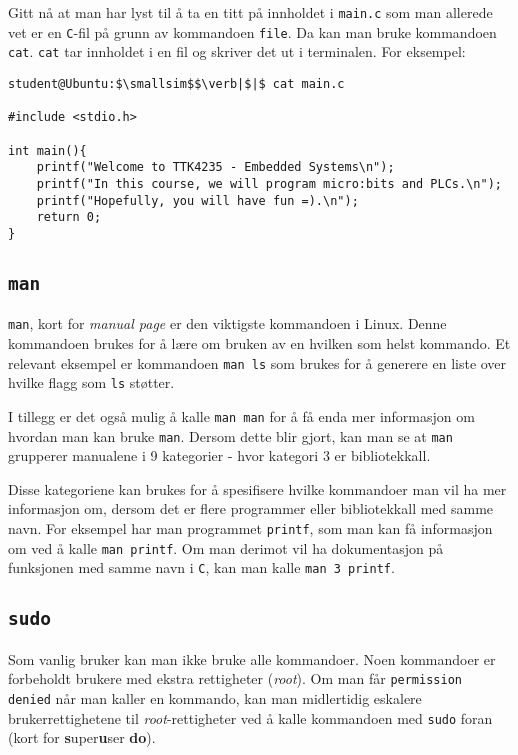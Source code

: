 \begin{alphasection}
Gitt nå at man har lyst til å ta en titt på innholdet i \verb|main.c| som man allerede vet er en \verb|C|-fil på grunn av kommandoen \verb|file|. Da kan man bruke kommandoen \verb|cat|. \verb|cat| tar innholdet i en fil og skriver det ut i terminalen. For eksempel:

\begin{lstlisting}[mathescape=true]
student@Ubuntu:$\smallsim$$\verb|$|$ cat main.c

#include <stdio.h>

int main(){
    printf("Welcome to TTK4235 - Embedded Systems\n");
    printf("In this course, we will program micro:bits and PLCs.\n");
    printf("Hopefully, you will have fun =).\n");
    return 0;
}
\end{lstlisting}


\cprotect\subsection{\lstinline{man}}

\verb|man|, kort for \textit{manual page} er den viktigste kommandoen i Linux. Denne kommandoen brukes for å lære om bruken av en hvilken som helst kommando. Et relevant eksempel er kommandoen \verb|man ls| som brukes for å generere en liste over hvilke flagg som \verb|ls| støtter. 

I tillegg er det også mulig å kalle \verb|man man| for å få enda mer informasjon om hvordan man kan bruke \verb|man|. Dersom dette blir gjort, kan man se at \verb|man| grupperer manualene i 9 kategorier - hvor kategori 3 er bibliotekkall. 

Disse kategoriene kan brukes for å spesifisere hvilke kommandoer man vil ha mer informasjon om, dersom det er flere programmer eller bibliotekkall med samme navn. For eksempel har man programmet \verb|printf|, som  man kan få informasjon om ved å kalle \verb|man printf|. Om man derimot vil ha dokumentasjon på funksjonen med samme navn i \verb|C|, kan man kalle \verb|man 3 printf|.

\cprotect\subsection{\lstinline{sudo}}

Som vanlig bruker kan man ikke bruke alle kommandoer. Noen kommandoer er forbeholdt brukere med ekstra rettigheter (\textit{root}). Om man får \verb|permission denied| når man kaller en kommando, kan man midlertidig eskalere brukerrettighetene til \textit{root}-rettigheter ved å kalle kommandoen med \verb|sudo| foran (kort for \textbf{s}uper\textbf{u}ser \textbf{do}). 


\end{alphasection}
